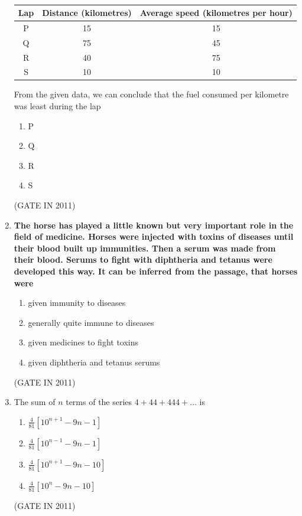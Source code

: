 \documentclass[journal]{IEEEtran}
\begin{document}
\begin{enumerate}
\begin{table}[H]
\begin{tabular}{|c|c|c|}
\hline
Lap & Distance (kilometres) & Average speed (kilometres per hour) \\
\hline
P & 15 & 15 \\
Q & 75 & 45 \\
R & 40 & 75 \\
S & 10 & 10 \\
\hline
\end{tabular}
\caption{}
\label{tab:tab1}
\end{table}


From the given data, we can conclude that the fuel consumed per kilometre was least during the lap

\begin{multicols}{4}
\begin{enumerate}
\item P
\item Q
\item R
\item S
\end{enumerate}
\end{multicols} \hfill(GATE IN 2011)

\item \textbf{The horse has played a little known but very important role in the field of medicine. Horses were injected with toxins of diseases until their blood built up immunities. Then a serum was made from their blood. Serums to fight with diphtheria and tetanus were developed this way. It can be inferred from the passage, that horses were}


\begin{enumerate}
\item given immunity to diseases
\item generally quite immune to diseases
\item given medicines to fight toxins
\item given diphtheria and tetanus serums
\end{enumerate}
 \hfill(GATE IN 2011)

\item The sum of $n$ terms of the series $4+44+444+\ldots$ is


\begin{enumerate}
\item $\frac{4}{81} [10^{n+1}-9n-1]$
\item $\frac{4}{81} [10^{n-1}-9n-1]$
\item $\frac{4}{81} [10^{n+1}-9n-10]$
\item $\frac{4}{81} [10^{n}-9n-10]$
\end{enumerate}
 \hfill(GATE IN 2011)


\end{enumerate}
\end{document}
